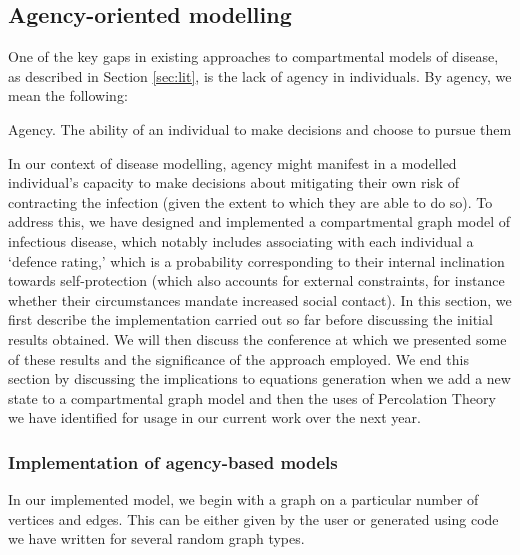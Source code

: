 \documentclass[../report.tex]{subfiles}
\begin{document}
\subsection{Agency-oriented modelling}

One of the key gaps in existing approaches to compartmental models of disease, as described in Section \ref{sec:lit}, is the lack of agency in individuals. By agency, we mean the following:
\theoremstyle{definition}
\begin{definition}{Agency.}
The ability of an individual to make decisions and choose to pursue them
\end{definition}
In our context of disease modelling, agency might manifest in a modelled individual's capacity to make decisions about mitigating their own risk of contracting the infection (given the extent to which they are able to do so). To address this, we have designed and implemented a compartmental graph model of infectious disease, which notably includes associating with each individual a `defence rating,' which is a probability corresponding to their internal inclination towards self-protection (which also accounts for external constraints, for instance whether their circumstances mandate increased social contact). In this section, we first describe the implementation carried out so far before discussing the initial results obtained. We will then discuss the conference at which we presented some of these results and the significance of the approach employed. We end this section by discussing the implications to equations generation when we add a new state to a compartmental graph model and then the uses of Percolation Theory we have identified for usage in our current work over the next year.

\subsubsection{Implementation of agency-based models}

In our implemented model, we begin with a graph on a particular number of vertices and edges. This can be either given by the user or generated using code we have written for several random graph types.
\end{document}
